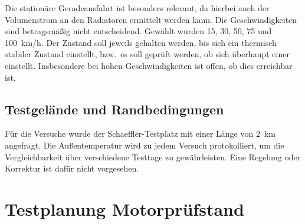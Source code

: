 Die stationäre Geradeausfahrt ist besonders relevant, da hierbei auch der
Volumenstrom an den Radiatoren ermittelt werden kann. Die Geschwindigkeiten
sind betragsmäßig nicht entscheidend. Gewählt wurden \SI{15}{}, \SI{30}{},
\SI{50}{}, \SI{75}{} und \SI{100}{km/h}. Der Zustand soll jeweils gehalten
werden, bis sich ein thermisch stabiler Zustand einstellt, bzw.\ es soll
geprüft werden, ob sich überhaupt einer einstellt. Insbesondere bei hohen
Geschwindigkeiten ist offen, ob dies erreichbar ist.


\subsection{Testgelände und Randbedingungen}

Für die Versuche wurde der Schaeffler-Testplatz mit einer Länge von
\SI{2}{km} angefragt. Die Außentemperatur wird zu jedem Versuch protokolliert,
um die Vergleichbarkeit über verschiedene Testtage zu gewährleisten. Eine
Regelung oder Korrektur ist dafür nicht vorgesehen.


 
\section{Testplanung Motorprüfstand}
\label{subsec:testplan_pruefstand}
 

